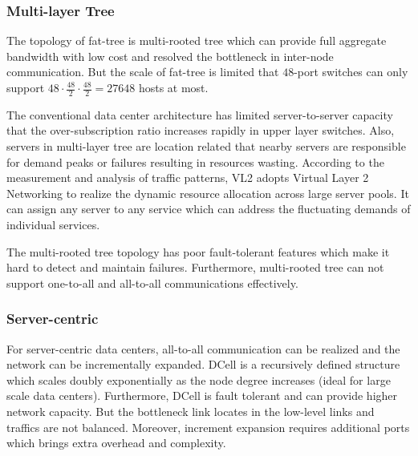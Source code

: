 \documentclass[journal,onecolumn,11pt]{IEEEtran}
\begin{document}
\subsubsection{Multi-layer Tree}

The topology of fat-tree is multi-rooted tree which can provide full aggregate bandwidth with low cost and resolved the bottleneck in inter-node communication. But the scale of fat-tree is limited that $48$-port switches can only support $48 \cdot \frac{48}{2} \cdot \frac{48}{2}=27648$ hosts at most.

The conventional data center architecture has limited server-to-server capacity that the over-subscription ratio increases rapidly in upper layer switches. Also, servers in multi-layer tree are location related that nearby servers are responsible for demand peaks or failures resulting in resources wasting. According to the measurement and analysis of traffic patterns, VL2 adopts Virtual Layer 2 Networking to realize the dynamic resource allocation across large server pools. It can assign any server to any service which can address the fluctuating demands of individual services.

The multi-rooted tree topology has poor fault-tolerant features which make it hard to detect and maintain failures. Furthermore, multi-rooted tree can not support one-to-all and all-to-all communications effectively.


\subsubsection{Server-centric}

For server-centric data centers, all-to-all communication can be realized and the network can be incrementally expanded. DCell is a recursively defined structure which scales doubly exponentially as the node degree increases (ideal for large scale data centers). Furthermore, DCell is fault tolerant and can provide higher network capacity. But the bottleneck link locates in the low-level links and traffics are not balanced. Moreover, increment expansion requires additional ports which brings extra overhead and complexity.

%
%
\end{document}
